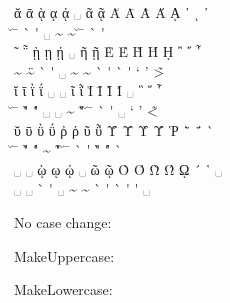 \documentclass[a4paper]{article}
\begin{document}
{  ᾰ   ᾱ   ᾲ   ᾳ   ᾴ   ␣   ᾶ    ᾷ    Ᾰ   Ᾱ   Ὰ   Ά   ᾼ   ᾽   ι  ᾿ \\
  \u\textalpha{}
  \=\textalpha{}
  \`\textalpha\ypogegrammeni{}
  \textalpha\ypogegrammeni{}
  \'\textalpha\ypogegrammeni{}
  ␣ \~\textalpha{}
  \~\textalpha\ypogegrammeni{}
  \u\textAlpha{}
  \=\textAlpha{}
  \`\textAlpha{}
  \'\textAlpha{}
  \textAlpha\ypogegrammeni{}
  \>{}
  \prosgegrammeni{}
  \>{} \\

  ῀   ῁   ῂ   ῃ   ῄ   ␣   ῆ    ῇ    Ὲ   Έ   Ὴ   Ή   ῌ   ῍   ῎  ῏ \\
  \~{}
  \"\~{}
  \`\texteta\ypogegrammeni{}
  \texteta\ypogegrammeni{}
  \'\texteta\ypogegrammeni{}
  ␣ \~\texteta{}
  \~\texteta\ypogegrammeni{}
  \`\textEpsilon{}
  \'\textEpsilon{}
  \`\textEta{}
  \'\textEta{}
  \textEta\ypogegrammeni{}
  \>`{}
  \>'{}
  \~>{} \\

  ῐ   ῑ   ῒ   ΐ   ␣   ␣   ῖ    ῗ    Ῐ   Ῑ   Ὶ   Ί   ␣   ῝   ῞  ῟ \\
  \u\textiota{}
  \=\textiota{}
  \`"\textiota{}
  \'"\textiota{}
  ␣ ␣ \~\textiota{}
  \~"\textiota{}
  \u\textIota{}
  \=\textIota{}
  \`\textIota{}
  \'\textIota{}
  ␣
  \<`{}
  \<'{}
  \~<{} \\

  ῠ   ῡ   ῢ   ΰ   ῤ    ῥ    ῦ   ῧ   Ῠ  Ῡ  Ὺ   Ύ   Ῥ   ῭   ΅  ` \\
  \u\textupsilon{}
  \=\textupsilon{}
  \`"\textupsilon{}
  \'"\textupsilon{}
  \>\textrho{}
  \<\textrho{}
  \~\textupsilon{}
  \~"\textupsilon{}
  \u\textUpsilon{}
  \=\textUpsilon{}
  \`\textUpsilon{}
  \'\textUpsilon{}
  \<\textRho{}
  \`"{}
  \'"{}
  \`{} \\

  ␣   ␣   ῲ   ῳ   ῴ   ␣   ῶ    ῷ    Ὸ   Ό   Ὼ   Ώ   ῼ   ´   ῾  ␣ \\

  ␣ ␣ \`\textomega\ypogegrammeni{}
  \textomega\ypogegrammeni{}
  \'\textomega\ypogegrammeni{}
  ␣ \~\textomega{}
  \~\textomega\ypogegrammeni{}
  \`\textOmicron{}
  \'\textOmicron{}
  \`\textOmega{}
  \'\textOmega{}
  \textOmega\ypogegrammeni{}
  \'{}
  \<{} ␣
}

No case change:
\begin{quote}
  \GreekExtended
\end{quote}
%
MakeUppercase:
\begin{quote}
  \MakeUppercase{\GreekExtended}
\end{quote}
%
MakeLowercase:
\begin{quote}
  \MakeLowercase{\GreekExtended}
\end{quote}
\end{document}
